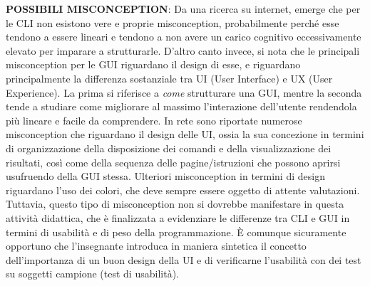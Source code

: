 \textbf{POSSIBILI MISCONCEPTION}:
  Da una ricerca su internet, emerge che per le CLI non esistono vere e proprie misconception, probabilmente perché esse tendono a essere lineari e tendono a non avere un carico cognitivo eccessivamente elevato per imparare a strutturarle.
  D'altro canto invece, si nota che le principali misconception per le GUI riguardano il design di esse, e riguardano principalmente la differenza sostanziale tra UI (User Interface) e UX (User Experience). La prima si riferisce a \textit{come} strutturare una GUI, mentre la seconda tende a studiare come migliorare al massimo l'interazione dell'utente rendendola più lineare e facile da comprendere.
  In rete sono riportate numerose misconception che riguardano il design delle UI, ossia la sua concezione in termini di organizzazione della disposizione dei comandi e della visualizzazione dei risultati, così come della sequenza delle pagine/istruzioni che possono aprirsi usufruendo della GUI stessa.
  Ulteriori misconception in termini di design riguardano l'uso dei colori, che deve sempre essere oggetto di attente valutazioni.
  Tuttavia, questo tipo di misconception non si dovrebbe manifestare in questa attività didattica, che è finalizzata a evidenziare le differenze tra CLI e GUI in termini di usabilità e di peso della programmazione.
  È comunque sicuramente opportuno che l'insegnante introduca in maniera sintetica il concetto dell'importanza di un buon design della UI e di verificarne l'usabilità con dei test su soggetti campione (test di usabilità).
  
